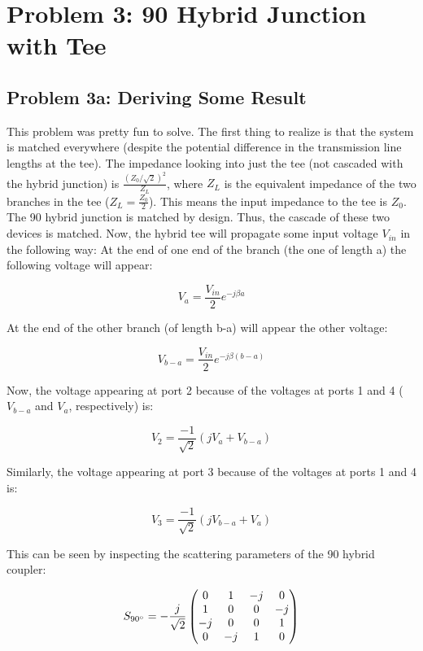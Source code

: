 \section*{Problem 3: 90 \degree Hybrid Junction with Tee}

\subsection*{Problem 3a: Deriving Some Result}

This problem was pretty fun to solve. The first thing to realize is that the
system is matched everywhere (despite the potential difference in the transmission line
lengths at the tee). The impedance looking into just the tee (not cascaded with
the hybrid junction) is $\frac{\left( Z_0/\sqrt{2} \right)^2}{Z_{L}}$, where
$Z_L$ is the equivalent impedance of the two branches in the tee ($Z_L =
\frac{Z_0}{2}$). This means the input impedance to the tee is $Z_0$. The 90
\degree hybrid junction is matched by design. Thus, the cascade of these two
devices is matched. Now, the hybrid tee will propagate some input voltage
$V_{in}$ in the following way: At the end of one end of the branch (the one of
length a) the following voltage will appear:

\[ 
    V_a = \frac{V_{in}}{2} e^{-j \beta a} 
\]

At the end of the other branch (of length b-a) will appear the other voltage:

\[ 
    V_{b-a} = \frac{V_{in}}{2} e^{-j \beta \left( b-a \right)} 
\]

Now, the voltage appearing at port 2 because of the voltages at ports 1 and 4
($V_{b-a}$ and $V_a$, respectively) is:

\[ 
    V_2 = \frac{-1}{\sqrt{2}} \left( j V_a + V_{b-a}  \right) 
\]

Similarly, the voltage appearing at port 3 because of the voltages at ports 1
and 4 is:

\[ 
    V_3 = \frac{-1}{\sqrt{2}} \left( j V_{b-a} +  V_{a} \right)
\]

This can be seen by inspecting the scattering parameters of the 90 \degree
hybrid coupler:

\[ 
    S_{90\degree} = -\frac{j}{\sqrt{2}} \begin{pmatrix}
        0 & 1 & -j & 0 \\ 1 & 0 & 0 & -j \\ -j & 0 & 0 & 1 \\ 0 & -j & 1 & 0
    \end{pmatrix} 
\]

